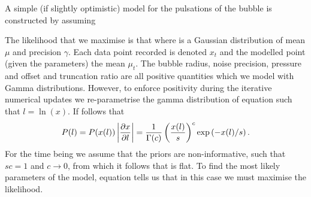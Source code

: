 
A simple (if slightly optimistic) model for the pulsations of the bubble 
is constructed by  assuming

The likelihood that we maximise is that
where 
is a Gaussian distribution of mean $\mu$ and precision  $\gamma$.
Each data point recorded is denoted $x_t$ and the modelled point (given the parameters) the mean  $\mu_t$.
The bubble radius, noise precision, pressure and offset and truncation ratio are all positive quantities which we model with Gamma distributions.
However, to enforce positivity during the iterative numerical updates 
we re-parametrise the gamma distribution of equation  such that $l = \ln(x)$.
If follows that
\begin{align}
  P(l) = P(x(l))\left| \frac{\partial x}{\partial l} \right| = \frac{1}{\Gamma(c)}\left( \frac{x(l)}{s} \right)^c\exp\left( -x(l)/s \right).
\label{eqn:logGamma}
\end{align}
For the time being we assume that the priors are non-informative, such that $sc = 1$ and $c\rightarrow 0$,
from which it follows that  is flat.
To find the most likely parameters of the model, 
equation  tells us that in this case we must  maximise the likelihood.



